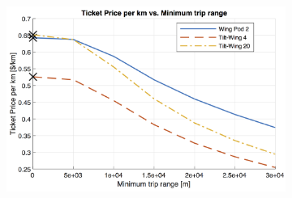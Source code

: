 \begin{figure}[H]
\begin{subfigure}[t]{0.33\textwidth}
    \centering
    \includegraphics[width=\textwidth]{Figures/minRange_TPrice_perkmNOPAD.png}
    \captionsetup{width=.8\linewidth}
    \caption{}
    \label{fig:sens3}
\end{subfigure}
\label{fig:sens123}
\end{figure}


